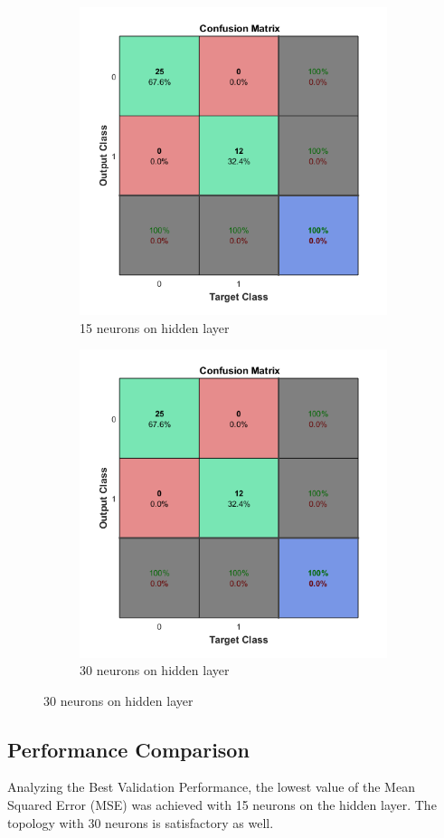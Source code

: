\documentclass[12pt]{article}
\begin{document}
\begin{figure}[H]
	\begin{subfigure}{9cm}
	\centering\includegraphics[width=9cm]{images/conf15_1.png}
	\caption{15 neurons on hidden layer}
	\end{subfigure}%
	\begin{subfigure}{9cm}
	\centering\includegraphics[width=9cm]{images/conf30_1.png}
	\caption{30 neurons on hidden layer}
	\end{subfigure}
	\end{figure}




\newpage
	\subsection{Performance Comparison}
	Analyzing the Best Validation Performance, the lowest value of the Mean Squared Error (MSE) was achieved with 15 neurons on the hidden layer. The topology with 30 neurons is satisfactory as well.
	
\end{document}
